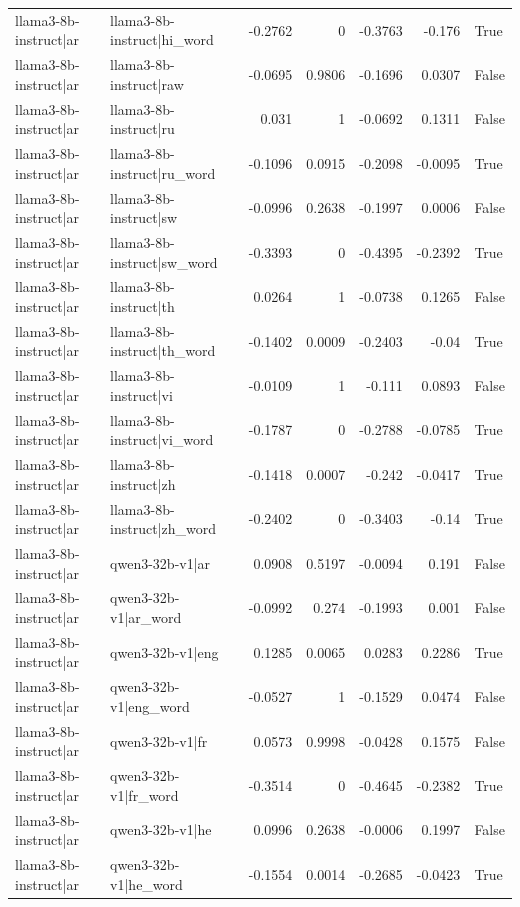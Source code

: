 \begin{table}
\begin{tabular}{l l r r r r l}
llama3-8b-instruct|ar & llama3-8b-instruct|hi_word & -0.2762 & 0 & -0.3763 & -0.176 & True \\
llama3-8b-instruct|ar & llama3-8b-instruct|raw & -0.0695 & 0.9806 & -0.1696 & 0.0307 & False \\
llama3-8b-instruct|ar & llama3-8b-instruct|ru & 0.031 & 1 & -0.0692 & 0.1311 & False \\
llama3-8b-instruct|ar & llama3-8b-instruct|ru_word & -0.1096 & 0.0915 & -0.2098 & -0.0095 & True \\
llama3-8b-instruct|ar & llama3-8b-instruct|sw & -0.0996 & 0.2638 & -0.1997 & 0.0006 & False \\
llama3-8b-instruct|ar & llama3-8b-instruct|sw_word & -0.3393 & 0 & -0.4395 & -0.2392 & True \\
llama3-8b-instruct|ar & llama3-8b-instruct|th & 0.0264 & 1 & -0.0738 & 0.1265 & False \\
llama3-8b-instruct|ar & llama3-8b-instruct|th_word & -0.1402 & 0.0009 & -0.2403 & -0.04 & True \\
llama3-8b-instruct|ar & llama3-8b-instruct|vi & -0.0109 & 1 & -0.111 & 0.0893 & False \\
llama3-8b-instruct|ar & llama3-8b-instruct|vi_word & -0.1787 & 0 & -0.2788 & -0.0785 & True \\
llama3-8b-instruct|ar & llama3-8b-instruct|zh & -0.1418 & 0.0007 & -0.242 & -0.0417 & True \\
llama3-8b-instruct|ar & llama3-8b-instruct|zh_word & -0.2402 & 0 & -0.3403 & -0.14 & True \\
llama3-8b-instruct|ar & qwen3-32b-v1|ar & 0.0908 & 0.5197 & -0.0094 & 0.191 & False \\
llama3-8b-instruct|ar & qwen3-32b-v1|ar_word & -0.0992 & 0.274 & -0.1993 & 0.001 & False \\
llama3-8b-instruct|ar & qwen3-32b-v1|eng & 0.1285 & 0.0065 & 0.0283 & 0.2286 & True \\
llama3-8b-instruct|ar & qwen3-32b-v1|eng_word & -0.0527 & 1 & -0.1529 & 0.0474 & False \\
llama3-8b-instruct|ar & qwen3-32b-v1|fr & 0.0573 & 0.9998 & -0.0428 & 0.1575 & False \\
llama3-8b-instruct|ar & qwen3-32b-v1|fr_word & -0.3514 & 0 & -0.4645 & -0.2382 & True \\
llama3-8b-instruct|ar & qwen3-32b-v1|he & 0.0996 & 0.2638 & -0.0006 & 0.1997 & False \\
llama3-8b-instruct|ar & qwen3-32b-v1|he_word & -0.1554 & 0.0014 & -0.2685 & -0.0423 & True \\

\end{tabular}
\end{table}
